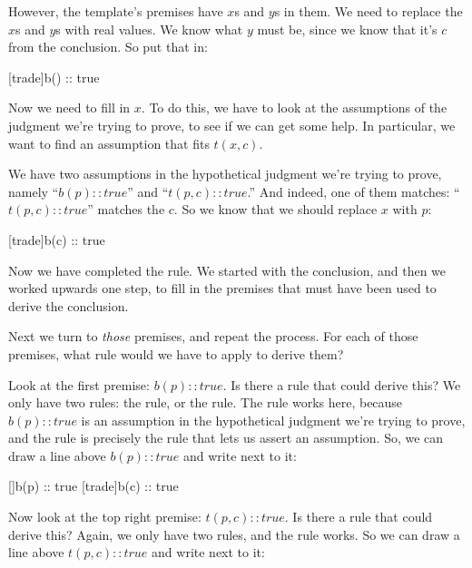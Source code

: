 \documentclass[../../../main.tex]{subfiles}
\begin{document}
\noindent
However, the template's premises have $x$s and $y$s in them. We need to replace the $x$s and $y$s with real values. We know what $y$ must be, since we know that it's $c$ from the conclusion. So put that in:

\begin{prooftree*}
  [trade]{b() :: true}
\end{prooftree*}

\noindent
Now we need to fill in $x$. To do this, we have to look at the assumptions of the judgment we're trying to prove, to see if we can get some help. In particular, we want to find an assumption that fits $t(x, c)$. 

We have two assumptions in the hypothetical judgment we're trying to prove, namely ``$b(p) :: true$'' and ``$t(p, c) :: true$.'' And indeed, one of them matches: ``$t(p, c) :: true$'' matches the $c$. So we know that we should replace $x$ with $p$:

\begin{prooftree*}
  [trade]{b(c) :: true}
\end{prooftree*}

\noindent
Now we have completed the  rule. We started with the conclusion, and then we worked upwards one step, to fill in the premises that must have been used to derive the conclusion.

Next we turn to \emph{those} premises, and repeat the process. For each of those premises, what rule would we have to apply to derive them? 

Look at the first premise: $b(p) :: true$. Is there a rule that could derive this? We only have two rules: the  rule, or the  rule. The  rule works here, because $b(p) :: true$ is an assumption in the hypothetical judgment we're trying to prove, and the  rule is precisely the rule that lets us assert an assumption. So, we can draw a line above $b(p) :: true$ and write  next to it:

\begin{prooftree*}
  \hypo{}
  []{b(p) :: true}
  [trade]{b(c) :: true}
\end{prooftree*}

\noindent
Now look at the top right premise: $t(p, c) :: true$. Is there a rule that could derive this? Again, we only have two rules, and the  rule works. So we can draw a line above $t(p, c) :: true$ and write  next to it:
\end{document}
